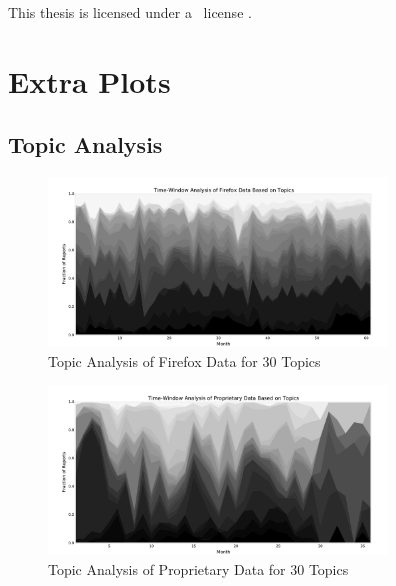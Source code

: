 \documentclass[nopalatino,nolot,nolof,color]{fithesis3}
\begin{document}
 \makeatletter
  \thesis@blocks@cover
  \thesis@blocks@titlePage
  \thesis@blocks@frontMatter
  \begin{center}
    \begin{minipage}{\textwidth}
      This thesis is licensed under a \doclicenseLongNameRef~license \doclicenseIcon.%
    \end{minipage}
  \end{center}
  \thesis@blocks@assignment
  \thesis@blocks@declaration
  \thesis@blocks@thanks
  \thesis@blocks@clearRight
  \thesis@blocks@abstract
  \thesis@blocks@keywords
  \thesis@blocks@tables
  \thesis@blocks@mainMatter
 \makeatother

 
 
 
 
 
 
 

 
 

 \appendix
 \chapter{Extra Plots}
 \label{appendix:extra-plots}

 \section{Topic Analysis}

 \begin{figure}[htbp]
    \centering
        \includegraphics[width=340px]{./images/topic_component_distribution/firefox_topic.pdf}
    \caption{Topic Analysis of Firefox Data for 30 Topics}
    \label{fig:distribution.firefox.topic.30}
 \end{figure}

 \begin{figure}[htbp]
    \centering
        \includegraphics[width=340px]{./images/topic_component_distribution/proprietary_topic.pdf}
    \caption{Topic Analysis of Proprietary Data for 30 Topics}
    \label{fig:distribution.prop.topic.30}
 \end{figure}
\end{document}
